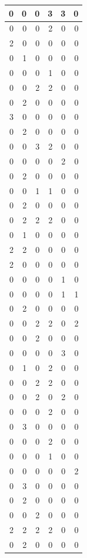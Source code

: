 \documentclass[
]{article}
\begin{document}
\begin{tabular}{r|r|r|r|r|r}
0 & 0 & 0 & 3 & 3 & 0\\
\hline
0 & 0 & 0 & 2 & 0 & 0\\
\hline
2 & 0 & 0 & 0 & 0 & 0\\
\hline
0 & 1 & 0 & 0 & 0 & 0\\
\hline
0 & 0 & 0 & 1 & 0 & 0\\
\hline
0 & 0 & 2 & 2 & 0 & 0\\
\hline
0 & 2 & 0 & 0 & 0 & 0\\
\hline
3 & 0 & 0 & 0 & 0 & 0\\
\hline
0 & 2 & 0 & 0 & 0 & 0\\
\hline
0 & 0 & 3 & 2 & 0 & 0\\
\hline
0 & 0 & 0 & 0 & 2 & 0\\
\hline
0 & 2 & 0 & 0 & 0 & 0\\
\hline
0 & 0 & 1 & 1 & 0 & 0\\
\hline
0 & 2 & 0 & 0 & 0 & 0\\
\hline
0 & 2 & 2 & 2 & 0 & 0\\
\hline
0 & 1 & 0 & 0 & 0 & 0\\
\hline
2 & 2 & 0 & 0 & 0 & 0\\
\hline
2 & 0 & 0 & 0 & 0 & 0\\
\hline
0 & 0 & 0 & 0 & 1 & 0\\
\hline
0 & 0 & 0 & 0 & 1 & 1\\
\hline
0 & 2 & 0 & 0 & 0 & 0\\
\hline
0 & 0 & 2 & 2 & 0 & 2\\
\hline
0 & 0 & 2 & 0 & 0 & 0\\
\hline
0 & 0 & 0 & 0 & 3 & 0\\
\hline
0 & 1 & 0 & 2 & 0 & 0\\
\hline
0 & 0 & 2 & 2 & 0 & 0\\
\hline
0 & 0 & 2 & 0 & 2 & 0\\
\hline
0 & 0 & 0 & 2 & 0 & 0\\
\hline
0 & 3 & 0 & 0 & 0 & 0\\
\hline
0 & 0 & 0 & 2 & 0 & 0\\
\hline
0 & 0 & 0 & 1 & 0 & 0\\
\hline
0 & 0 & 0 & 0 & 0 & 2\\
\hline
0 & 3 & 0 & 0 & 0 & 0\\
\hline
0 & 2 & 0 & 0 & 0 & 0\\
\hline
0 & 0 & 2 & 0 & 0 & 0\\
\hline
2 & 2 & 2 & 2 & 0 & 0\\
\hline
0 & 2 & 0 & 0 & 0 & 0\\

\end{tabular}
\end{document}
